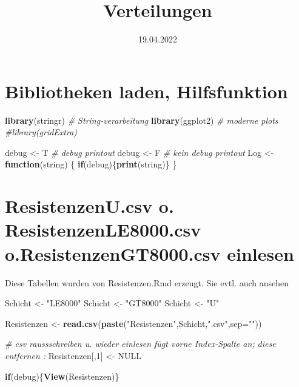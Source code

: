\documentclass[
]{article}
\title{Verteilungen}
\author{}
\date{\vspace{-2.5em}19.04.2022}
\newenvironment{Shaded}{\begin{snugshade}}{\end{snugshade}}
\newcommand{\CommentTok}[1]{\textcolor[rgb]{0.56,0.35,0.01}{\textit{#1}}}
\newcommand{\ControlFlowTok}[1]{\textcolor[rgb]{0.13,0.29,0.53}{\textbf{#1}}}
\newcommand{\DataTypeTok}[1]{\textcolor[rgb]{0.13,0.29,0.53}{#1}}
\newcommand{\DecValTok}[1]{\textcolor[rgb]{0.00,0.00,0.81}{#1}}
\newcommand{\KeywordTok}[1]{\textcolor[rgb]{0.13,0.29,0.53}{\textbf{#1}}}
\newcommand{\NormalTok}[1]{#1}
\newcommand{\OtherTok}[1]{\textcolor[rgb]{0.56,0.35,0.01}{#1}}
\newcommand{\StringTok}[1]{\textcolor[rgb]{0.31,0.60,0.02}{#1}}
\begin{document}
\maketitle

\hypertarget{bibliotheken-laden-hilfsfunktion}{%
\section{Bibliotheken laden,
Hilfsfunktion}\label{bibliotheken-laden-hilfsfunktion}}

\begin{Shaded}
\begin{Highlighting}[]
\KeywordTok{library}\NormalTok{(stringr)    }\CommentTok{# String-verarbeitung}
\KeywordTok{library}\NormalTok{(ggplot2)    }\CommentTok{# moderne plots}
\CommentTok{#library(gridExtra)}

\NormalTok{debug <-}\StringTok{ }\NormalTok{T  }\CommentTok{# debug printout}
\NormalTok{debug <-}\StringTok{ }\NormalTok{F  }\CommentTok{# kein debug printout}
\NormalTok{Log <-}\StringTok{ }\ControlFlowTok{function}\NormalTok{(string) \{}
  \ControlFlowTok{if}\NormalTok{(debug)\{}\KeywordTok{print}\NormalTok{(string)\}  }
\NormalTok{\}}
\end{Highlighting}
\end{Shaded}

\hypertarget{resistenzenu.csv-o.-resistenzenle8000.csv-o.resistenzengt8000.csv-einlesen}{%
\section{ResistenzenU.csv o. ResistenzenLE8000.csv
o.ResistenzenGT8000.csv
einlesen}\label{resistenzenu.csv-o.-resistenzenle8000.csv-o.resistenzengt8000.csv-einlesen}}

Diese Tabellen wurden von Resistenzen.Rmd erzeugt. Sie evtl. auch
ansehen

\begin{Shaded}
\begin{Highlighting}[]
\NormalTok{Schicht <-}\StringTok{ "LE8000"}
\NormalTok{Schicht <-}\StringTok{ "GT8000"}
\NormalTok{Schicht <-}\StringTok{ "U"}

\NormalTok{Resistenzen <-}\StringTok{ }\KeywordTok{read.csv}\NormalTok{(}\KeywordTok{paste}\NormalTok{(}\StringTok{"Resistenzen"}\NormalTok{,Schicht,}\StringTok{".csv"}\NormalTok{,}\DataTypeTok{sep=}\StringTok{""}\NormalTok{))}

\CommentTok{# csv raussschreiben u. wieder einlesen fügt vorne Index-Spalte an; diese entfernen :}
\NormalTok{Resistenzen[,}\DecValTok{1}\NormalTok{] <-}\StringTok{ }\OtherTok{NULL}                      

\ControlFlowTok{if}\NormalTok{(debug)\{}\KeywordTok{View}\NormalTok{(Resistenzen)\}}
\end{Highlighting}
\end{Shaded}
\end{document}
